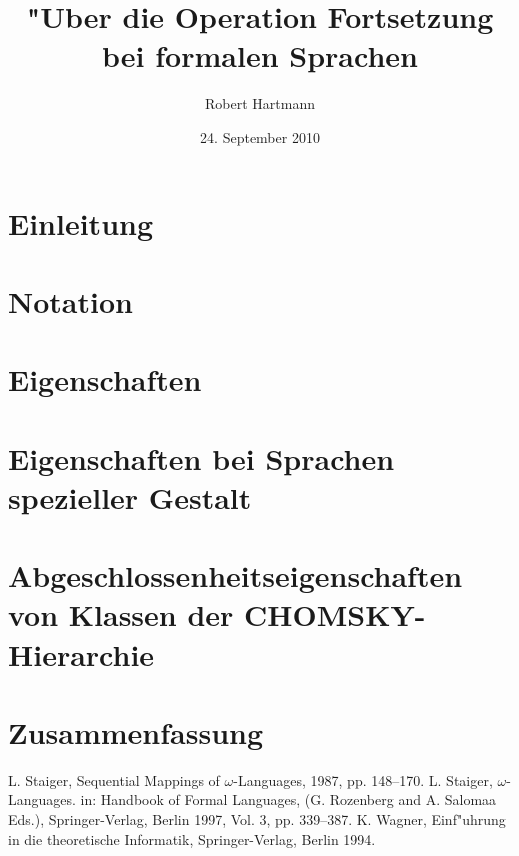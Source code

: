 \documentclass[12pt]{scrreprt}
\author{Robert Hartmann}
\title{"Uber die Operation Fortsetzung bei formalen Sprachen}
\date{24. September 2010}
\theoremstyle{remark}
\begin{document}

%

\pagestyle{plain}
\tableofcontents

\onehalfspacing

\chapter{Einleitung}


\chapter{Notation}


\chapter{Eigenschaften}


\chapter{Eigenschaften bei Sprachen spezieller Gestalt}


\chapter{Abgeschlossenheitseigenschaften von Klassen der CHOMSKY-Hierarchie}


\chapter{Zusammenfassung}



\begin{thebibliography}{9}
L. Staiger, Sequential Mappings of $\omega$-Languages, 1987, pp. 148--170.
L. Staiger, $\omega$-Languages. in: Handbook of Formal Languages, (G. Rozenberg and A. Salomaa Eds.), Springer-Verlag, Berlin 1997, Vol. 3, pp. 339--387.
K. Wagner, Einf"uhrung in die theoretische Informatik, Springer-Verlag, Berlin 1994.

\end{thebibliography}



\end{document}
